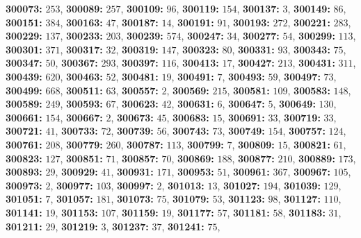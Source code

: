 \textsf{\bfseries 300073:} $253$, \textsf{\bfseries 300089:} $257$, \textsf{\bfseries 300109:} $96$, \textsf{\bfseries 300119:} $154$, \textsf{\bfseries 300137:} $3$, \textsf{\bfseries 300149:} $86$, \textsf{\bfseries 300151:} $384$, \textsf{\bfseries 300163:} $47$, \textsf{\bfseries 300187:} $14$, \textsf{\bfseries 300191:} $91$, \textsf{\bfseries 300193:} $272$, \textsf{\bfseries 300221:} $283$, \textsf{\bfseries 300229:} $137$, \textsf{\bfseries 300233:} $203$, \textsf{\bfseries 300239:} $574$, \textsf{\bfseries 300247:} $34$, \textsf{\bfseries 300277:} $54$, \textsf{\bfseries 300299:} $113$, \textsf{\bfseries 300301:} $371$, \textsf{\bfseries 300317:} $32$, \textsf{\bfseries 300319:} $147$, \textsf{\bfseries 300323:} $80$, \textsf{\bfseries 300331:} $93$, \textsf{\bfseries 300343:} $75$, \textsf{\bfseries 300347:} $50$, \textsf{\bfseries 300367:} $293$, \textsf{\bfseries 300397:} $116$, \textsf{\bfseries 300413:} $17$, \textsf{\bfseries 300427:} $213$, \textsf{\bfseries 300431:} $311$, \textsf{\bfseries 300439:} $620$, \textsf{\bfseries 300463:} $52$, \textsf{\bfseries 300481:} $19$, \textsf{\bfseries 300491:} $7$, \textsf{\bfseries 300493:} $59$, \textsf{\bfseries 300497:} $73$, \textsf{\bfseries 300499:} $668$, \textsf{\bfseries 300511:} $63$, \textsf{\bfseries 300557:} $2$, \textsf{\bfseries 300569:} $215$, \textsf{\bfseries 300581:} $109$, \textsf{\bfseries 300583:} $148$, \textsf{\bfseries 300589:} $249$, \textsf{\bfseries 300593:} $67$, \textsf{\bfseries 300623:} $42$, \textsf{\bfseries 300631:} $6$, \textsf{\bfseries 300647:} $5$, \textsf{\bfseries 300649:} $130$, \textsf{\bfseries 300661:} $154$, \textsf{\bfseries 300667:} $2$, \textsf{\bfseries 300673:} $45$, \textsf{\bfseries 300683:} $15$, \textsf{\bfseries 300691:} $33$, \textsf{\bfseries 300719:} $33$, \textsf{\bfseries 300721:} $41$, \textsf{\bfseries 300733:} $72$, \textsf{\bfseries 300739:} $56$, \textsf{\bfseries 300743:} $73$, \textsf{\bfseries 300749:} $154$, \textsf{\bfseries 300757:} $124$, \textsf{\bfseries 300761:} $208$, \textsf{\bfseries 300779:} $260$, \textsf{\bfseries 300787:} $113$, \textsf{\bfseries 300799:} $7$, \textsf{\bfseries 300809:} $15$, \textsf{\bfseries 300821:} $61$, \textsf{\bfseries 300823:} $127$, \textsf{\bfseries 300851:} $71$, \textsf{\bfseries 300857:} $70$, \textsf{\bfseries 300869:} $188$, \textsf{\bfseries 300877:} $210$, \textsf{\bfseries 300889:} $173$, \textsf{\bfseries 300893:} $29$, \textsf{\bfseries 300929:} $41$, \textsf{\bfseries 300931:} $171$, \textsf{\bfseries 300953:} $51$, \textsf{\bfseries 300961:} $367$, \textsf{\bfseries 300967:} $105$, \textsf{\bfseries 300973:} $2$, \textsf{\bfseries 300977:} $103$, \textsf{\bfseries 300997:} $2$, \textsf{\bfseries 301013:} $13$, \textsf{\bfseries 301027:} $194$, \textsf{\bfseries 301039:} $129$, \textsf{\bfseries 301051:} $7$, \textsf{\bfseries 301057:} $181$, \textsf{\bfseries 301073:} $75$, \textsf{\bfseries 301079:} $53$, \textsf{\bfseries 301123:} $98$, \textsf{\bfseries 301127:} $110$, \textsf{\bfseries 301141:} $19$, \textsf{\bfseries 301153:} $107$, \textsf{\bfseries 301159:} $19$, \textsf{\bfseries 301177:} $57$, \textsf{\bfseries 301181:} $58$, \textsf{\bfseries 301183:} $31$, \textsf{\bfseries 301211:} $29$, \textsf{\bfseries 301219:} $3$, \textsf{\bfseries 301237:} $37$, \textsf{\bfseries 301241:} $75$, 
